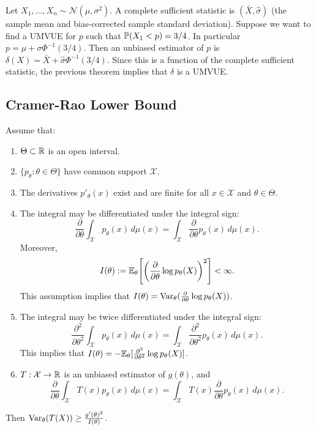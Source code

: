 \begin{example}
	Let $X_1, \dots, X_n \sim \mathcal{N}(\mu, \sigma^2)$. A complete sufficient statistic is $(\bar{X}, \hat{\sigma})$ (the sample mean and bias-corrected sample standard deviation). Suppose we want to find a UMVUE for $p$ such that $\mathbb{P}(X_1 < p) = 3/4$. In particular $p = \mu + \sigma \Phi^{-1}(3/4)$. Then an unbiased estimator of $p$ is $\delta(X) = \bar{X} + \hat{\sigma} \Phi^{-1}(3/4)$. Since this is a function of the complete sufficient statistic, the previous theorem implies that $\delta$ is a UMVUE.
\end{example}


\subsection{Cramer-Rao Lower Bound}

\begin{theorem}
Assume that: \begin{enumerate}[label=(\alph*)]
	\item $\Theta \subset \mathbb{R}$ is an open interval.
	\item $\{p_\theta : \theta \in \Theta \}$ have common support $\mathcal X$.
	\item The derivatives $p'_\theta(x)$ exist and are finite for all $x \in \mathcal X$ and $\theta \in \Theta$.
	\item The integral may be differentiated under the integral sign:
	\[
	\frac{\partial}{\partial\theta}
	\int_{\mathcal X}p_\theta(x)\,d\mu(x)
	=
	\int_{\mathcal X}
	\frac{\partial}{\partial\theta}p_\theta(x)\,d\mu(x).
	\]
	Moreover,
	\[
	I(\theta):=
	\mathbb{E}_\theta\!\left[
	\left(\frac{\partial}{\partial\theta}\log p_\theta(X)\right)^2
	\right]<\infty.
	\]
	This assumption implies that
	$I(\theta)=\operatorname{Var}_\theta(\frac{\partial}{\partial\theta}\log p_\theta(X))$.
	\item The integral may be twice differentiated under the integral sign:
	\[
	\frac{\partial^2}{\partial\theta^2}
	\int_{\mathcal X}p_\theta(x)\,d\mu(x)
	=
	\int_{\mathcal X}
	\frac{\partial^2}{\partial\theta^2}p_\theta(x)\,d\mu(x).
	\]
	This implies that
	$I(\theta)=-\mathbb{E}_\theta[\frac{\partial^2}{\partial\theta^2}\log p_\theta(X)]$.
	\item $T : \mathcal X \to \mathbb{R}$ is an unbiased estimator of $g(\theta)$, and
	\[
	\frac{\partial}{\partial\theta}
	\int_{\mathcal X}T(x)p_\theta(x)\,d\mu(x)
	=
	\int_{\mathcal X}
	T(x)\frac{\partial}{\partial\theta}p_\theta(x)\,d\mu(x).
	\]
\end{enumerate}
Then $\operatorname{Var}_\theta(T(X)) \geq \frac{g'(\theta)^2}{I(\theta)}$.
\end{theorem}

